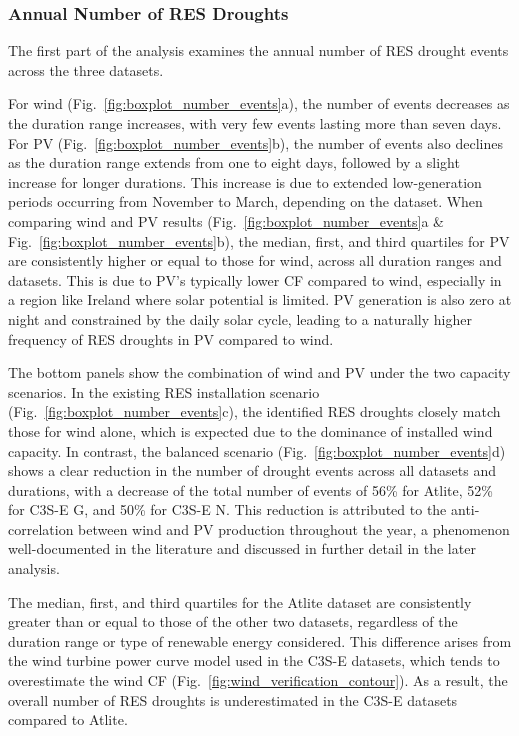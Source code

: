 \documentclass[a4paper, 11pt]{article}
\begin{document}
\subsubsection{Annual Number of RES Droughts}

The first part of the analysis examines the annual number of RES drought events across the three datasets. 

For wind (Fig.~\ref{fig:boxplot_number_events}a), the number of events decreases as the duration range increases, with very few events lasting more than seven days. For PV (Fig.~\ref{fig:boxplot_number_events}b), the number of events also declines as the duration range extends from one to eight days, followed by a slight increase for longer durations. This increase is due to extended low-generation periods occurring from November to March, depending on the dataset. When comparing wind and PV results (Fig.~\ref{fig:boxplot_number_events}a \& Fig.~\ref{fig:boxplot_number_events}b), the median, first, and third quartiles for PV are consistently higher or equal to those for wind, across all duration ranges and datasets. This is due to PV's typically lower CF compared to wind, especially in a region like Ireland where solar potential is limited. PV generation is also zero at night and constrained by the daily solar cycle, leading to a naturally higher frequency of RES droughts in PV compared to wind.

The bottom panels show the combination of wind and PV under the  two capacity scenarios. In the existing RES installation scenario (Fig.~\ref{fig:boxplot_number_events}c), the identified RES droughts closely match those for wind alone, which is expected due to the dominance of installed wind capacity. In contrast, the balanced scenario (Fig.~\ref{fig:boxplot_number_events}d) shows a clear reduction in the number of drought events across all datasets and durations, with a decrease of the total number of events of 56\% for Atlite, 52\% for C3S-E G, and 50\% for C3S-E N. This reduction is attributed to the anti-correlation between wind and PV production throughout the year, a phenomenon well-documented in the literature \cite{kaspar2019drought} and discussed in further detail in the later analysis.

The median, first, and third quartiles for the Atlite dataset are consistently greater than or equal to those of the other two datasets, regardless of the duration range or type of renewable energy considered. This difference arises from the wind turbine power curve model used in the C3S-E datasets, which tends to overestimate the wind CF (Fig.~\ref{fig:wind_verification_contour}). As a result, the overall number of RES droughts is underestimated in the C3S-E datasets compared to Atlite.
\end{document}
